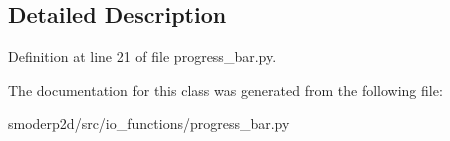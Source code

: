 \subsection{Detailed Description}


Definition at line 21 of file progress\-\_\-bar.\-py.



The documentation for this class was generated from the following file\-:\begin{DoxyCompactItemize}
\item 
smoderp2d/src/io\-\_\-functions/progress\-\_\-bar.\-py\end{DoxyCompactItemize}
